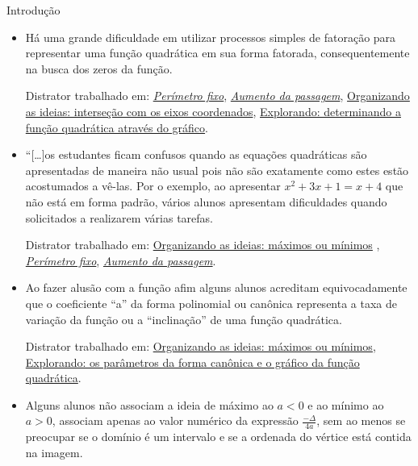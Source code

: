 \begin{apresentacao}{Introdução}
\begin{itemize}
\item {} 
Há uma grande dificuldade em utilizar processos simples de fatoração para representar uma função quadrática em sua forma fatorada, consequentemente na busca dos zeros da função. \citep{parent2015}

Distrator trabalhado em: \hyperref[\detokenize{AF209-3:sub-ativ-funcao-quadratica-perimetro-fixo}]{\textit{Perímetro fixo}}, \hyperref[\detokenize{AF209-7:ativ-funcao-quadratica-aumento-passagem}]{\textit{Aumento da passagem}}, \hyperref[\detokenize{AF209-8:sec-funcao-quadratica-org-ideias-intersecoes-com-eixos}]{Organizando as ideias: interseção com os eixos coordenados}, \hyperref[\detokenize{AF209-9:sec-funcao-quadratica-obtendo-lei-do-grafico}]{Explorando: determinando a função quadrática através do gráfico}.

\item {} 
“{[}…{]}os estudantes ficam confusos quando as equações quadráticas são apresentadas de maneira não usual pois não são exatamente como estes estão acostumados a vê-las. Por o exemplo, ao apresentar \(x^2 + 3x + 1 = x + 4\) que não está em forma padrão, vários alunos apresentam dificuldades quando solicitados a realizarem várias tarefas. \citep{kotsopoulos2007}

Distrator trabalhado em: \hyperref[\detokenize{AF209-3:sec-funcao-quadratica-org-ideias-quad-max-min-na-quadratica}]{Organizando as ideias: máximos ou mínimos} , \hyperref[\detokenize{AF209-3:sub-ativ-funcao-quadratica-perimetro-fixo}]{\textit{Perímetro fixo}}, \hyperref[\detokenize{AF209-7:ativ-funcao-quadratica-aumento-passagem}]{\textit{Aumento da passagem}}.

\item {} 
Ao fazer alusão com a função afim alguns alunos acreditam equivocadamente que o coeficiente “a” da forma polinomial ou canônica representa a taxa de variação da função ou a “inclinação” de uma função quadrática. \citep{parent2015}

Distrator trabalhado em: \hyperref[\detokenize{AF209-3:sec-funcao-quadratica-org-ideias-quad-max-min-na-quadratica}]{Organizando as ideias: máximos ou mínimos}, \hyperref[\detokenize{AF209-5:sec-funcao-quadratica-parametros-grafico}]{Explorando: os parâmetros da forma canônica e o gráfico da função quadrática}.

\item {} 
Alguns alunos não associam a ideia de máximo ao \(a<0\) e ao mínimo ao \(a>0\), associam apenas ao valor numérico da expressão \(\frac{-\Delta}{4a}\), sem ao menos se preocupar se o domínio é um intervalo e se a ordenada do vértice está contida na imagem.


\end{itemize}
\end{apresentacao}
